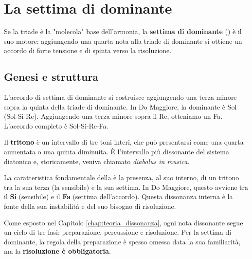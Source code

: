 \chapter{La settima di dominante}
\label{chap:settima_dominante}

Se la triade è la "molecola" base dell'armonia, la \textbf{settima di dominante} () è il suo motore: aggiungendo una quarta nota alla triade di dominante si ottiene un accordo di forte tensione e di spinta verso la risoluzione.

\section{Genesi e struttura}
\label{sec:genesi_v7}

L'accordo di settima di dominante si costruisce aggiungendo una terza minore sopra la quinta della triade di dominante. In Do Maggiore, la dominante è Sol (Sol-Si-Re). Aggiungendo una terza minore sopra il Re, otteniamo un Fa. L'accordo completo è Sol-Si-Re-Fa.

\begin{definizione}[Il Tritono]
	\label{def:tritono}
	Il \textbf{tritono} è un intervallo di tre toni interi, che può presentarsi come una quarta aumentata o una quinta diminuita. È l'intervallo più dissonante del sistema diatonico e, storicamente, veniva chiamato \textit{diabolus in musica}.
\end{definizione}

La caratteristica fondamentale della  è la presenza, al suo interno, di un tritono tra la sua terza (la sensibile) e la sua settima. In Do Maggiore, questo avviene tra il \textbf{Si} (sensibile) e il \textbf{Fa} (settima dell'accordo). Questa dissonanza interna è la fonte della sua instabilità e del suo bisogno di risoluzione.

\begin{esempio}
	\label{ex:tritono_v7}
\end{esempio}

\begin{regola}
        \label{reg:preparazione_risoluzione}
        Come esposto nel Capitolo \ref{chap:teoria_dissonanza}, ogni nota dissonante segue un ciclo di tre fasi: preparazione, percussione e risoluzione.
        Per la settima di dominante, la regola della preparazione è spesso omessa data la sua familiarità, ma la \textbf{risoluzione è obbligatoria}.
\end{regola}

